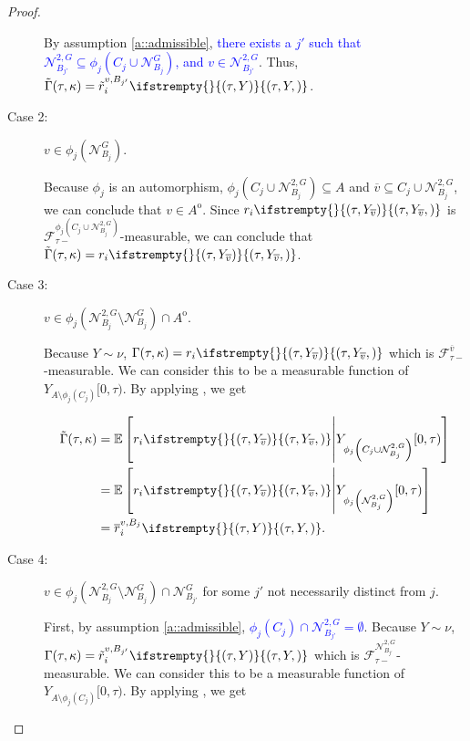 \documentclass[12pt]{article}
\newcommand{\mb}{\mathbb}
\newcommand{\mc}{\mathcal}
\newcommand{\ov}{\overline}
\newcommand{\tb}{\textcolor{blue}}
\newcommand{\ex}[1]{\mb{E}\left[#1\right]}			%
\newcommand{\gneigh}[2]{\mc{N}^{#1}_{#2}}			%
\newcommand{\dgneigh}[2]{\mc{N}^{2,#1}_{#2}}		%
\newcommand{\cl}[1]{\ov{#1}}						%
\newcommand{\rate}{r}								%
\newcommand{\F}{\mc{F}}								%
\newcommand{\vind}[1]{_{#1}}						%
\newcommand{\tmi}[1]{#1}							%
\newcommand{\vpara}[1]{^{#1}}						%
\newcommand{\stpara}[1]{_{#1}}						%
\newcommand{\tpara}[1]{_{#1}}						%
\newcommand{\tmepro}[3]{
\ifstrempty{#3}{
	\left(#1,#2\right)}{
	\left(#1,#2,#3\right)}}							%
\newcommand{\Xg}{Y}									%
\newcommand{\brate}{\alt{\rate}}					%
\newcommand{\inte}[1]{{#1}^\mathrm{o}}				%
\newcommand{\alt}[1]{\tilde{#1}}					%
\newcommand{\rt}{\tau}								%
\renewcommand{\mark}{\kappa}						%
\newcommand{\ratee}{\Gamma}							%
\newcommand{\cratee}{\alt{\ratee}}					%
\newcommand{\mm}{\nu}								%
\newcommand{\bgrate}{\ov{\rate}}					%
\newcommand{\vjpara}[2]{^{#1,#2}}					%
\begin{document}
\begin{proof}
\begin{description}
By assumption \ref{a::admissible}, \tb{there exists a \(j'\) such that \(\dgneigh{G}{B_{j'}} \subseteq \phi_j(C_j\cup \gneigh{G}{B_j})\), and \(v \in \dgneigh{G}{B_{j'}}\)}. Thus, \(\cratee(\rt,\mark) = \brate\vjpara{v}{B_{j'}}\stpara{i}\tmepro{\rt}{\Xg}{}\).

\item[Case 2: ] \(v\in \phi_j(\gneigh{G}{B_j})\). 

Because \(\phi_j\) is an automorphism, \(\phi_j\left(C_j\cup\dgneigh{G}{B_j}\right) \subseteq A\) and \(\cl{v} \subseteq C_j\cup\dgneigh{G}{B_j}\), we can conclude that \(v \in \inte{A}\). Since \(\rate\stpara{i}\tmepro{\rt}{\Xg\vind{\cl{v}}}{}\) is \(\F\vpara{\phi_j\left(C_j\cup\dgneigh{G}{B_j}\right)}\tpara{\rt-}\)-measurable, we can conclude that \(\cratee(\rt,\mark) = \rate\stpara{i}\tmepro{\rt}{\Xg\vind{\cl{v}}}{}\).

\item[Case 3: ] \(v \in \phi_j(\dgneigh{G}{B_j}\setminus\gneigh{G}{B_j})\cap\inte{A}\).

Because \(\Xg\sim\mm\), \(\ratee(\rt,\mark) = \rate\stpara{i}\tmepro{\rt}{\Xg\vind{\cl{v}}}{}\) which is \(\F\vpara{\cl{v}}\tpara{\rt-}\)-measurable. We can consider this to be a measurable function of \(\Xg\vind{A\setminus\phi_j(C_j)}\tmi{[0,\rt)}\). By applying \cite[lemma \ref{F-TL::Props}(e)]{F}, we get

\begin{align*}
\cratee(\rt,\mark) &= \ex{\rate\stpara{i}\tmepro{\rt}{\Xg\vind{\cl{v}}}{}\middle|\Xg\vind{\phi_j\left(C_j\cup\dgneigh{G}{B_j}\right)}\tmi{[0,\rt)}}\\
&= \ex{\rate\stpara{i}\tmepro{\rt}{\Xg\vind{\cl{v}}}{}\middle|\Xg\vind{\phi_j\left(\dgneigh{G}{B_j}\right)}\tmi{[0,\rt)}}\\
&= \bgrate\vjpara{v}{B_j}\stpara{i}\tmepro{\rt}{\Xg}{}.
\end{align*}

\item[Case 4: ] \(v \in \phi_j(\dgneigh{G}{B_j}\setminus\gneigh{G}{B_j})\cap \gneigh{G}{B_{j'}}\) for some \(j'\) not necessarily distinct from \(j\).

First, by assumption \ref{a::admissible}, \tb{\(\phi_j(C_j)\cap\dgneigh{G}{B_{j'}}= \emptyset\)}. Because \(\Xg\sim\mm\), \(\ratee(\rt,\mark) = \brate\vjpara{v}{B_{j'}}\stpara{i}\tmepro{\rt}{\Xg}{}\) which is \(\F\vpara{\dgneigh{G}{B_{j'}}}\tpara{\rt-}\)-measurable. We can consider this to be a measurable function of \(\Xg\vind{A\setminus\phi_j(C_j)}\tmi{[0,\rt)}\). By applying \cite[lemma \ref{F-TL::Props}(e)]{F}, we get


\end{description}
\end{proof}
\end{document}
